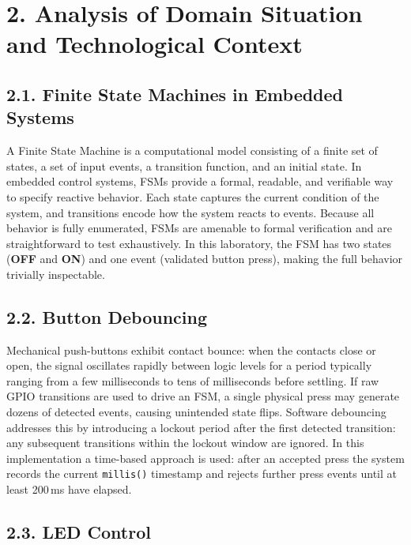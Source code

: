 \documentclass[12pt]{article}
\begin{document}
\section*{2. Analysis of Domain Situation and Technological Context}

\subsection*{2.1. Finite State Machines in Embedded Systems}

A Finite State Machine is a computational model consisting of a finite set of states, a set of input events, a transition function, and an initial state. In embedded control systems, FSMs provide a formal, readable, and verifiable way to specify reactive behavior. Each state captures the current condition of the system, and transitions encode how the system reacts to events. Because all behavior is fully enumerated, FSMs are amenable to formal verification and are straightforward to test exhaustively. In this laboratory, the FSM has two states (\textbf{OFF} and \textbf{ON}) and one event (validated button press), making the full behavior trivially inspectable.

\subsection*{2.2. Button Debouncing}

Mechanical push-buttons exhibit contact bounce: when the contacts close or open, the signal oscillates rapidly between logic levels for a period typically ranging from a few milliseconds to tens of milliseconds before settling. If raw GPIO transitions are used to drive an FSM, a single physical press may generate dozens of detected events, causing unintended state flips. Software debouncing addresses this by introducing a lockout period after the first detected transition: any subsequent transitions within the lockout window are ignored. In this implementation a time-based approach is used: after an accepted press the system records the current \texttt{millis()} timestamp and rejects further press events until at least 200\,ms have elapsed.

\subsection*{2.3. LED Control}
\end{document}
